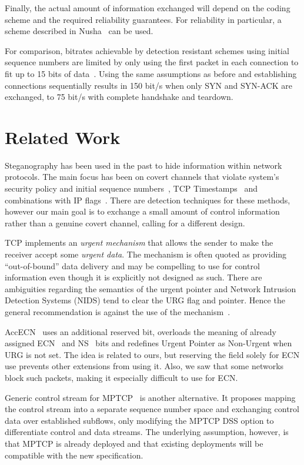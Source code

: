 \documentclass{sig-alternate-10pt}
\begin{document}
Finally, the actual amount of information exchanged will depend on the coding scheme and the required reliability guarantees. For reliability in particular, a scheme described in Nusha~\cite{Rutkowska:2004ul} can be used.

For comparison, bitrates achievable by detection resistant schemes using initial sequence numbers are limited by only using the first packet in each connection to fit up to 15 bits of data~\cite{Murdoch:2005fz}. Using the same assumptions as before and establishing connections sequentially results in 150 bit/s when only SYN and SYN-ACK are exchanged, to 75 bit/s with complete handshake and teardown.

\section{Related Work}
\label{sec:related}

Steganography has been used in the past to hide information within network protocols. The main focus has been on covert channels that violate system's security policy and initial sequence numbers~\cite{Rowland:1997vq}, TCP Timestamps~\cite{Giffin:2002wh} and combinations with IP flags~\cite{Murdoch:2005fz}. There are detection techniques for these methods, however our main goal is to exchange a small amount of control information rather than a genuine covert channel, calling for a different design.

TCP implements an \emph{urgent mechanism} that allows the sender to make the receiver accept some \emph{urgent data}. The mechanism is often quoted as providing ``out-of-bound'' data delivery and may be compelling to use for control information even though it is explicitly not designed as such. There are ambiguities regarding the semantics of the urgent pointer and Network Intrusion Detection Systems (NIDS) tend to clear the URG flag and pointer. Hence the general recommendation is against the use of the mechanism~\cite{Gont:2011vi}.

AccECN~\cite{Kuhlewind:2014vd} uses an additional reserved bit, overloads the meaning of already assigned ECN~\cite{Floyd:up} and NS~\cite{Ely:uc} bits and redefines Urgent Pointer as Non-Urgent when URG is not set. The idea is related to ours, but reserving the field solely for ECN use prevents other extensions from using it. Also, we saw that some networks block such packets, making it especially difficult to use for ECN.

Generic control stream for MPTCP~\cite{Bonaventure:wx} is another alternative. It proposes mapping the control stream into a separate sequence number space and exchanging control data over established subflows, only modifying the MPTCP DSS option to differentiate control and data streams. The underlying assumption, however, is that MPTCP is already deployed and that existing deployments will be compatible with the new specification.
\end{document}
